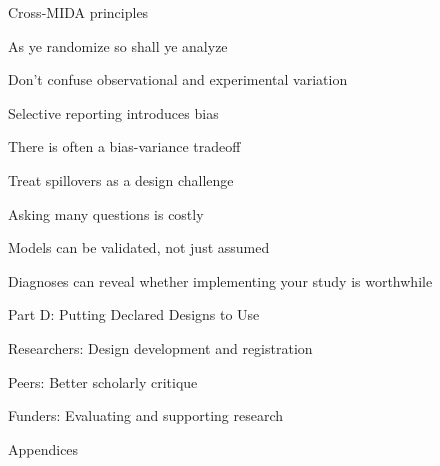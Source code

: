 \documentclass[11pt]{article}
\begin{document}
\begin{legal}
\begin{legal}
		\item Cross-MIDA principles
		
		\begin{legal}
		\item	As ye randomize so shall ye analyze
		\item	Don't confuse observational and experimental variation
		\item	Selective reporting introduces bias
		\item	There is often a bias-variance tradeoff
		\item	Treat spillovers as a design challenge
		\item	Asking many questions is costly			
		\item	Models can be validated, not just assumed
		\item Diagnoses can reveal whether implementing your study is worthwhile
		\end{legal}
	\end{legal}
	
\item Part D: Putting Declared Designs to Use

	\begin{legal}
	\item  Researchers: Design development and registration
	\item  Peers: Better scholarly critique
	\item  Funders: Evaluating and supporting research 
	\end{legal}


\item Appendices
\end{legal}

\newpage



\end{document}
